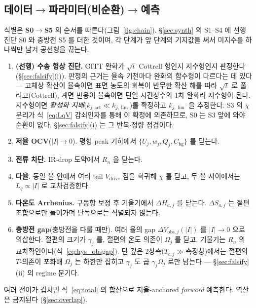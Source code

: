 \documentclass[11pt,a4paper]{article}
\newcommand{\drive}{\mathrm{drive}}
\newcommand{\bg}{\mathrm{bg}}
\begin{document}
\subsection{데이터$\to$파라미터(비순환)$\to$예측}
식별은 \textbf{S0$\to$S5} 의 순서를 따른다(그림~\ref{fig:chain}). \S\ref{sec:synth} 의 S1--S4 에 선행
진단 S0 와 충방전 S5 를 더한 것이며, 각 단계가 앞 단계의 기지값을 써서 미지수를 하나씩만 남겨 공선형을 끊는다.
\begin{enumerate}[label=\textbf{S\arabic*.},leftmargin=2.6em,itemsep=2pt,start=0]
\item \textbf{(선행) 수송 형상 진단.} GITT 완화가 $\sqrt t$ Cottrell 형인지 지수형인지 판정한다
  (\S\ref{sec:falsify}(i)). 판정의 근거는 율속 기전마다 완화의 함수형이 다르다는 데 있다 — 고체상 확산이
  율속이면 표면 농도의 회복이 반무한 확산 해를 따라 $\sqrt t$ 로 풀리고(Cottrell), 계면 반응이 율속이면 단일
  시간상수의 1차 완화라 지수형이 된다. 지수형이면 \emph{활성화 지배}($k_{j,\mathrm{act}}\ll k_{j,\lim}$)를 확정하고
  $k_{j,\lim}$ 을 추정한다. S3 의 $\chi$ 분리가 식~\eqref{eq:LqV} 감쇠인자를 통해 이 확정에 의존하므로,
  S0 는 S3 앞에 와야 순환이 없다. \S\ref{sec:falsify}(i) 는 그 반복$\cdot$정량 점검이다.
\item \textbf{저율 OCV}($|I|\!\to\!0$). 평형 peak 기하에서 $\{U_j,w_j,Q_j,C_\bg\}$ 를 닫는다.
\item \textbf{전류 차단.} IR-drop 도약에서 $R_n$ 을 닫는다.
\item \textbf{다율.} 동일 율 안에서 여러 tail $V_\drive$ 점을 회귀해 $\chi$ 를 닫고, 두 율 사이에서는
  $L_q\propto|I|$ 로 교차검증한다.
\item \textbf{다온도 Arrhenius.} 구동항 보정 후 기울기에서 $\Delta H_{a,j}$ 를 닫는다. $\Delta S_{a,j}$ 는
  절편 조합으로만 들어가며 단독으로는 식별되지 않는다.
\item \textbf{충방전 gap}(충방전을 다룰 때만). 여러 율의 gap $\Delta V_{\mathrm{obs},j}(|I|)$ 를
  $|I|\!\to\!0$ 으로 외삽한다. 절편의 크기가 $\gamma_j$ 를, 절편의 온도 의존이 $\Omega_j$ 를 닫고, 기울기는
  $R_n$ 의 교차확인이다(식~\eqref{eq:hys_obsgap}). 단 깊은 2상측($T_{c,j}\gg$측정창)에서는 절편의 $T$-의존이
  포화해 $\Omega_j$ 는 하한만 잡히고 $\gamma_j$ 도 곱 $\gamma_j\Omega_j$ 로만 남는다 —
  \S\ref{sec:falsify}(ii) 의 regime 분기다.
\end{enumerate}
여러 전이가 겹치면 식~\eqref{eq:total} 의 합산으로 저율-anchored \emph{forward} 예측한다. 역산은 금지된다
(\S\ref{sec:overlap}).
\end{document}
